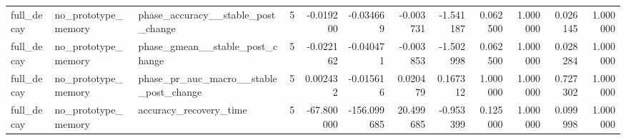 \begin{tabular}{lllrrrrrrrrr}
full\_decay & no\_prototype\_memory & phase\_accuracy\_\_stable\_post\_change & 5 & -0.019200 & -0.034669 & -0.003731 & -1.541187 & 0.062500 & 1.000000 & 0.026145 & 1.000000 \\
full\_decay & no\_prototype\_memory & phase\_gmean\_\_stable\_post\_change & 5 & -0.022162 & -0.040471 & -0.003853 & -1.502998 & 0.062500 & 1.000000 & 0.028284 & 1.000000 \\
full\_decay & no\_prototype\_memory & phase\_pr\_auc\_macro\_\_stable\_post\_change & 5 & 0.002432 & -0.015616 & 0.020479 & 0.167312 & 1.000000 & 1.000000 & 0.727302 & 1.000000 \\
full\_decay & no\_prototype\_memory & accuracy\_recovery\_time & 5 & -67.800000 & -156.099685 & 20.499685 & -0.953399 & 0.125000 & 1.000000 & 0.099998 & 1.000000 \\
\bottomrule
\end{tabular}
